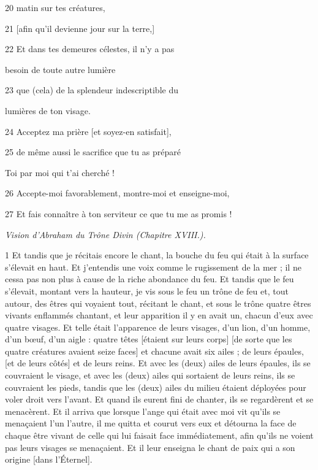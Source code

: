 \par 20 matin sur tes créatures,
\par 21 [afin qu'il devienne jour sur la terre,]
\par 22 Et dans tes demeures célestes, il n'y a pas
\par     besoin de toute autre lumière
\par 23 que (cela) de la splendeur indescriptible du
\par     lumières de ton visage.
\par 24 Acceptez ma prière [et soyez-en satisfait],
\par 25 de même aussi le sacrifice que tu as préparé
\par     Toi par moi qui t'ai cherché !
\par 26 Accepte-moi favorablement, montre-moi et enseigne-moi,
\par 27 Et fais connaître à ton serviteur ce que tu me as promis !


\par \textit{Vision d'Abraham du Trône Divin (Chapitre XVIII.).}

\par 1 Et tandis que je récitais encore le chant, la bouche du feu qui était à la surface s'élevait en haut. Et j'entendis une voix comme le rugissement de la mer ; il ne cessa pas non plus à cause de la riche abondance du feu. Et tandis que le feu s'élevait, montant vers la hauteur, je vis sous le feu un trône de feu et, tout autour, des êtres qui voyaient tout, récitant le chant, et sous le trône quatre êtres vivants enflammés chantant, et leur apparition il y en avait un, chacun d'eux avec quatre visages. Et telle était l'apparence de leurs visages, d'un lion, d'un homme, d'un bœuf, d'un aigle : quatre têtes [étaient sur leurs corps] [de sorte que les quatre créatures avaient seize faces] et chacune avait six ailes ; de leurs épaules, [et de leurs côtés] et de leurs reins. Et avec les (deux) ailes de leurs épaules, ils se couvraient le visage, et avec les (deux) ailes qui sortaient de leurs reins, ils se couvraient les pieds, tandis que les (deux) ailes du milieu étaient déployées pour voler droit vers l'avant. Et quand ils eurent fini de chanter, ils se regardèrent et se menacèrent. Et il arriva que lorsque l'ange qui était avec moi vit qu'ils se menaçaient l'un l'autre, il me quitta et courut vers eux et détourna la face de chaque être vivant de celle qui lui faisait face immédiatement, afin qu'ils ne voient pas leurs visages se menaçaient. Et il leur enseigna le chant de paix qui a son origine [dans l'Éternel].

